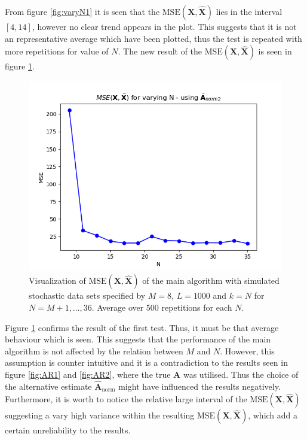\noindent
From figure \ref{fig:varyN1} it is seen that the $\text{MSE}(\mathbf{X}, \hat{\mathbf{X}})$ lies in the interval $[4,14]$, however no clear trend appears in the plot. 
This suggests that it is not an representative average which have been plotted, thus the test is repeated with more repetitions for value of $N$. The new result of the $\text{MSE}(\mathbf{X}, \hat{\mathbf{X}})$ is seen in figure \ref{fig:varyN2}.
\begin{figure}[H]
    \centering
	\includegraphics[scale=0.5]{figures/ch_6/varyN2.png}
	\caption{Visualization of $\text{MSE}(\mathbf{X}, \hat{\mathbf{X}})$ of the main algorithm with simulated stochastic data sets specified by $M = 8$, $L=1000$ and $k = N$ for $N = M+1, \hdots , 36$. Average over 500 repetitions for each $N$.}
	\label{fig:varyN2}
\end{figure}  
\noindent
Figure \ref{fig:varyN2} confirms the result of the first test. Thus, it must be that average behaviour which is seen. 
This suggests that the performance of the main algorithm is not affected by the relation between $M$ and $N$.
However, this assumption is counter intuitive and it is a contradiction to the results seen in figure \ref{fig:AR1} and \ref{fig:AR2}, where the true $\mathbf{A}$ was utilised. 
Thus the choice of the alternative estimate $\hat{\mathbf{A}}_{\text{norm}}$ might have influenced the results negatively. 
Furthermore, it is worth to notice the relative large interval of the $\text{MSE}(\mathbf{X}, \hat{\mathbf{X}})$ suggesting a vary high variance within the resulting $\text{MSE}(\mathbf{X}, \hat{\mathbf{X}})$, which add a certain unreliability to the results.    